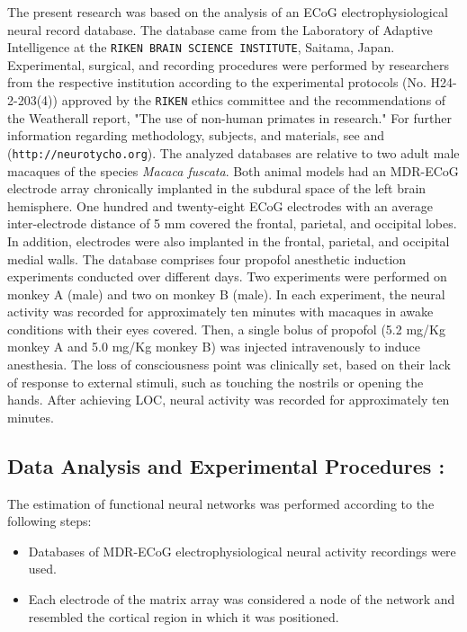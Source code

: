 \documentclass[twoside]{article}
\begin{document}
\begin{multicols}{2}
The present research was based on the analysis of an ECoG electrophysiological neural record database. The database came from the Laboratory of Adaptive Intelligence at the \texttt{RIKEN BRAIN SCIENCE INSTITUTE}, Saitama, Japan. Experimental, surgical, and recording procedures were performed by researchers from the respective institution according to the experimental protocols (No. H24-2-203(4)) approved by the \texttt{RIKEN} ethics committee and the recommendations of the Weatherall report, "The use of non-human primates in research." For further information regarding methodology, subjects, and materials, see \citep{nagasaka2011multidimensional} and (\texttt{http://neurotycho.org}).
The analyzed databases are relative to two adult male macaques of the species \textit{Macaca fuscata}. Both animal models had an MDR-ECoG electrode array chronically implanted in the subdural space of the left brain hemisphere. One hundred and twenty-eight ECoG electrodes with an average inter-electrode distance of 5 mm covered the frontal, parietal, and occipital lobes. In addition, electrodes were also implanted in the frontal, parietal, and occipital medial walls.
The database comprises four propofol anesthetic induction experiments conducted over different days. Two experiments were performed on monkey A (male) and two on monkey B (male).
In each experiment, the neural activity was recorded for approximately ten minutes with macaques in awake conditions with their eyes covered. Then, a single bolus of propofol (5.2 mg/Kg monkey A and 5.0 mg/Kg monkey B) was injected intravenously to induce anesthesia. The loss of consciousness point was clinically set, based on their lack of response to external stimuli, such as touching the nostrils or opening the hands. After achieving LOC, neural activity was recorded for approximately ten minutes.


\subsection*{Data Analysis and Experimental Procedures :}

The estimation of functional neural networks was performed according to the following steps:

\begin{itemize}

\item Databases of MDR-ECoG electrophysiological neural activity recordings were used.

\item Each electrode of the matrix array was considered a node of the network and resembled the cortical region in which it was positioned.


\end{itemize}
\end{multicols}
\end{document}
